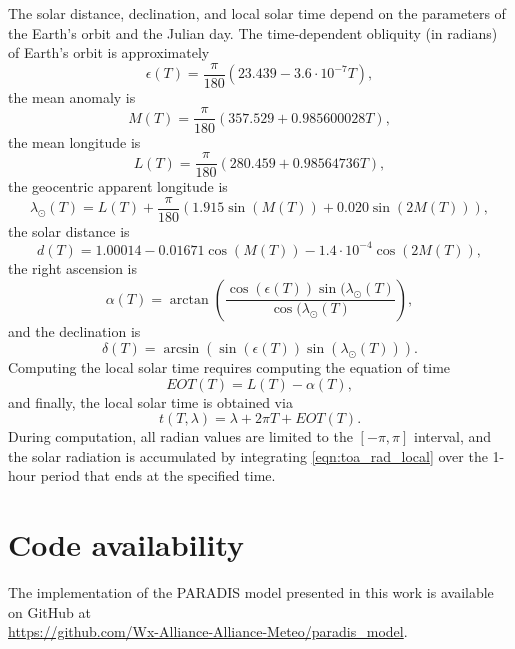 \documentclass[preprint]{article}
\begin{document}
\begin{appendices}
The solar distance, declination, and local solar time depend on the parameters of the Earth's orbit and the Julian day.  The time-dependent obliquity (in radians) of Earth's orbit is approximately
\begin{equation*}
    \epsilon(T) = \frac{\pi}{180} (23.439 - 3.6 \cdot 10^{-7}T),
\end{equation*}
the mean anomaly is
\begin{equation*}
    M(T) = \frac{\pi}{180} (357.529 + 0.985600028T),
\end{equation*}
the mean longitude is
\begin{equation*}
    L(T) = \frac{\pi}{180} (280.459 + 0.98564736T),
\end{equation*}
the geocentric apparent longitude is
\begin{equation*}
    \lambda_\odot(T) = L(T) + \frac{\pi}{180}(1.915 \sin(M(T)) + 0.020 \sin(2M(T))),
\end{equation*}
the solar distance is
\begin{equation*}
    d(T) = 1.00014 - 0.01671 \cos(M(T)) - 1.4 \cdot 10^{-4} \cos(2M(T)),
\end{equation*}
the right ascension is
\begin{equation*}
    \alpha(T) = \arctan\left(\frac
    {\cos(\epsilon(T)) \sin(\lambda_\odot(T)}{\cos(\lambda_\odot(T)}
    \right),
\end{equation*}
and the declination is
\begin{equation*}
    \delta(T) = \arcsin(\sin(\epsilon(T)) \sin(\lambda_\odot(T))).
\end{equation*}
Computing the local solar time requires computing the equation of time
\begin{equation*}
    EOT(T) = L(T) - \alpha(T),
\end{equation*}
and finally, the local solar time is obtained via
\begin{equation*}
    t(T,\lambda) = \lambda + 2\pi T + EOT(T).
\end{equation*}
During computation, all radian values are limited to the $[-\pi,\pi]$ interval, and the solar radiation is accumulated by integrating \eqref{eqn:toa_rad_local} over the 1-hour period that ends at the specified time.


\section{Code availability}

The implementation of the PARADIS model presented in this work   is available on GitHub at\\ \href{https://github.com/Wx-Alliance-Alliance-Meteo/paradis_model}{https://github.com/Wx-Alliance-Alliance-Meteo/paradis\_model}.

\end{appendices}
\end{document}
